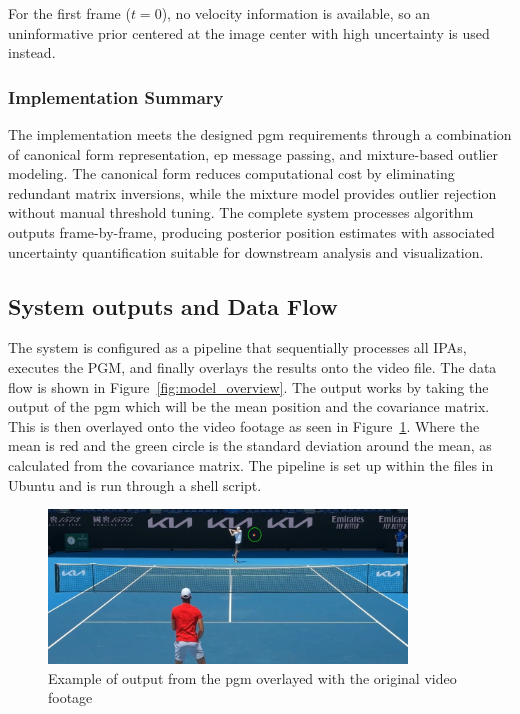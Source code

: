 \documentclass[12pt,a4paper]{article}
\begin{document}
For the first frame ($t=0$), no velocity information is available, so an uninformative prior centered at the image center with high uncertainty is used instead.

\subsubsection{Implementation Summary}
The implementation meets the designed \acs{pgm} requirements through a combination of canonical form representation, \acs{ep} message passing, and mixture-based outlier modeling. The canonical form reduces computational cost by eliminating redundant matrix inversions, while the mixture model provides outlier rejection without manual threshold tuning. The complete system processes algorithm outputs frame-by-frame, producing posterior position estimates with associated uncertainty quantification suitable for downstream analysis and visualization.


\subsection{System outputs and Data Flow}
The system is configured as a pipeline that sequentially processes all IPAs, executes the PGM, and finally overlays the results onto the video file. The data flow is shown in Figure~\ref{fig:model_overview}. The output works by taking the output of the \acs{pgm} which will be the mean position and the covariance matrix. This is then overlayed onto the video footage as seen in Figure~\ref{fig:output}. Where the mean is red and the green circle is the standard deviation around the mean, as calculated from the covariance matrix. The pipeline is set up within the files in Ubuntu and is run through a shell script.

\begin{figure}[H]
	\centering
	\includegraphics[width=0.85\textwidth]{ZvsDOut.jpg}
	\caption{Example of output from the \acs{pgm} overlayed with the original video footage}
	\label{fig:output}
\end{figure}
\end{document}
